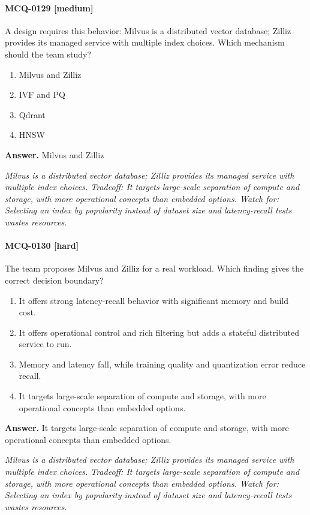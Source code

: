 \paragraph{MCQ-0129 [medium]} A design requires this behavior: Milvus is a distributed vector database; Zilliz provides its managed service with multiple index choices. Which mechanism should the team study?
\begin{enumerate}[label=\Alph*.]
\item Milvus and Zilliz
\item IVF and PQ
\item Qdrant
\item HNSW
\end{enumerate}
\noindent\textbf{Answer.} Milvus and Zilliz
\par\textit{Milvus is a distributed vector database; Zilliz provides its managed service with multiple index choices. Tradeoff: It targets large-scale separation of compute and storage, with more operational concepts than embedded options. Watch for: Selecting an index by popularity instead of dataset size and latency-recall tests wastes resources.}
\paragraph{MCQ-0130 [hard]} The team proposes Milvus and Zilliz for a real workload. Which finding gives the correct decision boundary?
\begin{enumerate}[label=\Alph*.]
\item It offers strong latency-recall behavior with significant memory and build cost.
\item It offers operational control and rich filtering but adds a stateful distributed service to run.
\item Memory and latency fall, while training quality and quantization error reduce recall.
\item It targets large-scale separation of compute and storage, with more operational concepts than embedded options.
\end{enumerate}
\noindent\textbf{Answer.} It targets large-scale separation of compute and storage, with more operational concepts than embedded options.
\par\textit{Milvus is a distributed vector database; Zilliz provides its managed service with multiple index choices. Tradeoff: It targets large-scale separation of compute and storage, with more operational concepts than embedded options. Watch for: Selecting an index by popularity instead of dataset size and latency-recall tests wastes resources.}

